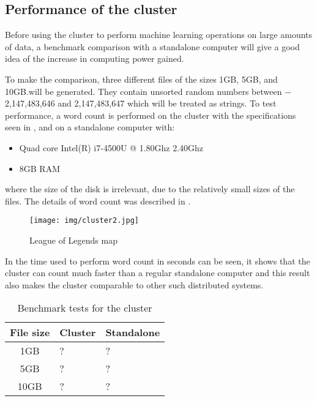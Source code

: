 \subsection{Performance of the cluster}\label{sec:benchmark}
Before using the cluster to perform machine learning operations on large amounts of data, a benchmark comparison with a standalone computer will give a good idea of the increase in computing power gained.

To make the comparison, three different files of the sizes 1GB, 5GB, and 10GB.\@ will be generated. They contain unsorted random numbers between $-$2,147,483,646 and 2,147,483,647 which will be treated as strings. To test performance, a word count is performed on the cluster with the specifications seen in , and on a standalone computer with:
\begin{itemize}
\item Quad core Intel(R) i7-4500U @ 1.80Ghz 2.40Ghz
\item 8GB RAM
\end{itemize}
where the size of the disk is irrelevant, due to the relatively small sizes of the files. The details of word count was described in .

\begin{figure}[!htb]
  \centering
    \texttt{[image: img/cluster2.jpg]}
  \caption{League of Legends map~\cite{lolmap}}\label{fig:lolmap}
\end{figure}

In  the time used to perform word count in seconds can be seen, it shows that the cluster can count much faster than a regular standalone computer and this result also makes the cluster comparable to other such distributed systems.

\begin{table}[!htb]
  \centering
  \begin{tabular}{|c|ll|}
    \hline
    File size & Cluster  & Standalone \\
    \hline
    1GB & ? & ? \\
    5GB & ? & ? \\
    10GB & ? & ? \\
    \hline
  \end{tabular}
  \caption{Benchmark tests for the cluster}
  \label{tab:bench}
\end{table}

